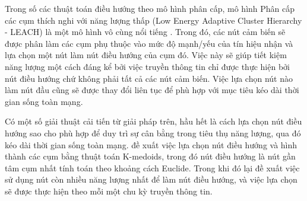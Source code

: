 Trong số các thuật toán điều hướng theo mô hình phân cấp, mô hình Phân cấp các cụm thích nghi với năng lượng thấp (Low Energy Adaptive Cluster Hierarchy - LEACH) là một mô hình vô cùng nổi tiếng \cite{heinzelman2000energy}. Trong đó, các nút cảm biến sẽ được phân làm các cụm phụ thuộc vào mức độ mạnh/yếu của tín hiệu nhận và lựa chọn một nút làm nút điều hướng của cụm đó. Việc này sẽ giúp tiết kiệm năng lượng một cách đáng kể bởi việc truyền thông tin chỉ được thực hiện bởi nút điều hướng chứ không phải tất cả các nút cảm biến. Việc lựa chọn nút nào làm nút đầu cũng sẽ được thay đổi liên tục để phù hợp với mục tiêu kéo dài thời gian sống toàn mạng.


Có một số giải thuật cải tiến từ giải pháp trên, hầu hết là cách lựa chọn nút điều hướng sao cho phù hợp để duy trì sự cân bằng trong tiêu thụ năng lượng, qua đó kéo dài thời gian sống toàn mạng. \cite{bakaraniya2013k} đề xuất việc lựa chọn nút điều hướng và hình thành các cụm bằng thuật toán K-medoids, trong đó nút điều hướng là nút gần tâm cụm nhất tính toán theo khoảng cách Euclide. Trong khi đó \cite{arumugam2015ee} lại đề xuất việc sử dụng nút còn nhiều năng lượng nhất để làm nút điều hướng, và việc lựa chọn sẽ được thực hiện theo mỗi một chu kỳ truyền thông tin.
